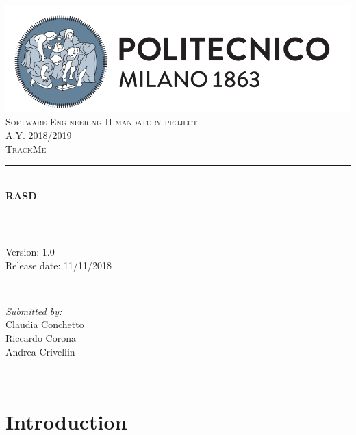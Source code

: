 \documentclass[11pt]{article}
\begin{document}
\begin{titlepage}
	\centering
	\vspace*{0.5 cm}
	\includegraphics[scale = 0.5]{PolimiLogo.png}\\[1.0 cm]
	\textsc{\Large Software Engineering II mandatory project}\\[0.2 cm]
	\textsc{\Large A.Y. 2018/2019}\\[2.0 cm]
	\textsc{\LARGE TrackMe}\\[0.5 cm]
	\rule{\linewidth}{0.2 mm}\\[0.4 cm]
	{\huge \bfseries RASD}\\[0.4 cm]

	\rule{\linewidth}{0.2 mm}\\[1.5 cm]

	\begin{minipage}{0.4\textwidth}
		\begin{flushleft} \large
			Version: 1.0\\
			Release date: 11/11/2018\\
		\end{flushleft}
	\end{minipage}~
	\begin{minipage}{0.4\textwidth}
		\begin{flushright} \large
			\emph{Submitted by:}\\
			Claudia Conchetto\\
			Riccardo Corona\\
			Andrea Crivellin\\
		\end{flushright}
	\end{minipage}\\[2 cm]
\end{titlepage}

\tableofcontents
\newpage

\section{Introduction}


\clearpage
\end{document}
